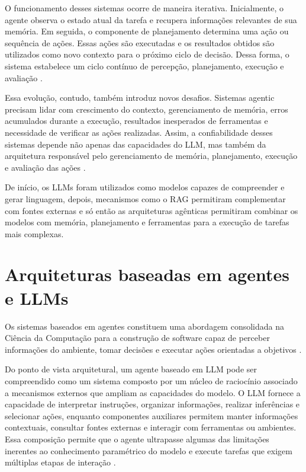 O funcionamento desses sistemas ocorre de maneira iterativa. Inicialmente, o agente observa o estado atual da tarefa e recupera informações relevantes de sua memória. Em seguida, o componente de planejamento determina uma ação ou sequência de ações. Essas ações são executadas e os resultados obtidos são utilizados como novo contexto para o próximo ciclo de decisão. Dessa forma, o sistema estabelece um ciclo contínuo de percepção, planejamento, execução e avaliação \cite{zhao2026survey}.

Essa evolução, contudo, também introduz novos desafios. Sistemas agentic precisam lidar com crescimento do contexto, gerenciamento de memória, erros acumulados durante a execução, resultados inesperados de ferramentas e necessidade de verificar as ações realizadas. Assim, a confiabilidade desses sistemas depende não apenas das capacidades do LLM, mas também da arquitetura responsável pelo gerenciamento de memória, planejamento, execução e avaliação das ações \cite{zhao2026survey}.

De início, os LLMs foram utilizados como modelos capazes de compreender e gerar linguagem, depois, mecanismos como o RAG permitiram complementar com fontes externas e só então as arquiteturas agênticas permitiram combinar os modelos com memória, planejamento e ferramentas para a execução de tarefas mais complexas. 

\section{Arquiteturas baseadas em agentes e LLMs}


Os sistemas baseados em agentes constituem uma abordagem consolidada na Ciência da Computação para a construção de software capaz de perceber informações do ambiente, tomar decisões e executar ações orientadas a objetivos \cite{muller1999}. 

Do ponto de vista arquitetural, um agente baseado em LLM pode ser compreendido como um sistema composto por um núcleo de raciocínio associado a mecanismos externos que ampliam as capacidades do modelo. O LLM fornece a capacidade de interpretar instruções, organizar informações, realizar inferências e selecionar ações, enquanto componentes auxiliares permitem manter informações contextuais, consultar fontes externas e interagir com ferramentas ou ambientes. Essa composição permite que o agente ultrapasse algumas das limitações inerentes ao conhecimento paramétrico do modelo e execute tarefas que exigem múltiplas etapas de interação \cite{cheng2026,zhao2026survey}.


